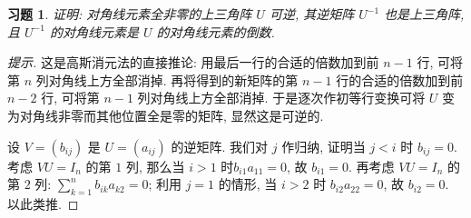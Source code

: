 \documentclass[UTF8]{ctexart}
\newtheorem{ex}[thm]{习题}
\begin{document}
\begin{ex}
证明: 对角线元素全非零的上三角阵 $U$ 可逆, 其逆矩阵 $U^{-1}$ 也是上三角阵,
且 $U^{-1}$ 的对角线元素是 $U$ 的对角线元素的倒数.
\end{ex}
\begin{proof}[提示]
	这是高斯消元法的直接推论: 用最后一行的合适的倍数加到前 $n-1$ 行, 可将第 $n$ 列对角线上方全部消掉. 再将得到的新矩阵的第 $n-1$ 行的合适的倍数加到前 $n-2$ 行, 可将第 $n-1$ 列对角线上方全部消掉. 于是逐次作初等行变换可将 $U$ 变为对角线非零而其他位置全是零的矩阵, 显然这是可逆的.
	
	设 $V=(b_{ij})$ 是 $U=(a_{ij})$ 的逆矩阵. 我们对 $j$ 作归纳, 证明当 $j<i$ 时 $b_{ij}=0$. 考虑 $VU=I_n$ 的第 $1$ 列, 那么当 $i>1$ 时$b_{i1}a_{11}=0$, 故 $b_{i1}=0$. 再考虑 $VU=I_n$ 的第 $2$ 列:  $\sum_{k=1}^nb_{ik}a_{k2}=0$; 利用 $j=1$ 的情形, 当 $i>2$ 时 $b_{i2}a_{22}=0$, 故 $b_{i2}=0$. 以此类推.
	\end{proof}
\end{document}
